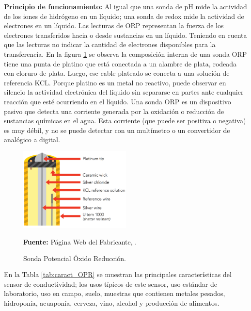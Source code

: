 \textbf{Principio de funcionamiento:}
Al igual que una sonda de pH mide la actividad de los iones de hidrógeno en un líquido; una sonda de redox mide la actividad de electrones en un líquido. Las lecturas de ORP representan la fuerza de los electrones transferidos hacia o desde sustancias en un líquido. Teniendo en cuenta que las lecturas no indicar la cantidad de electrones disponibles para la transferencia.
En la figura \ref{fig:OPR_prove} se observa la composición interna de una sonda ORP  tiene una punta de platino que está conectada a un alambre de plata, rodeada con cloruro de plata. Luego, ese cable plateado se conecta a una solución de referencia KCL. Porque platino es un metal no reactivo, puede observar en silencio la actividad electrónica del líquido sin separarse en partes ante cualquier reacción que esté ocurriendo en el líquido.
Una sonda ORP es un dispositivo pasivo que detecta una corriente generada por la oxidación o reducción de sustancias químicas en el agua. Esta corriente (que puede ser positiva o negativa) es muy débil, y no se puede detectar con un multímetro o un convertidor de analógico a digital.
\begin{figure}[H]
    \centering
    \includegraphics[width=0.5\textwidth]{Imagenes/cap3/sondaOPR.png}
    \caption[Sensor de ox\'igeno disuelto]{Sonda Potencial \'Oxido Reducción.}
    \textbf{Fuente: }P\'agina Web del Fabricante, \cite{atlas_ezo_OPR}.
    \label{fig:OPR_prove}
\end{figure}

En la Tabla \ref{tab:caract_OPR} se muestran las principales características del sensor de conductividad; los usos típicos de este sensor, uso estándar de laboratorio, uso en campo, suelo, muestras que contienen metales pesados, hidroponía, acuaponía, cerveza, vino, alcohol y producción de alimentos.

